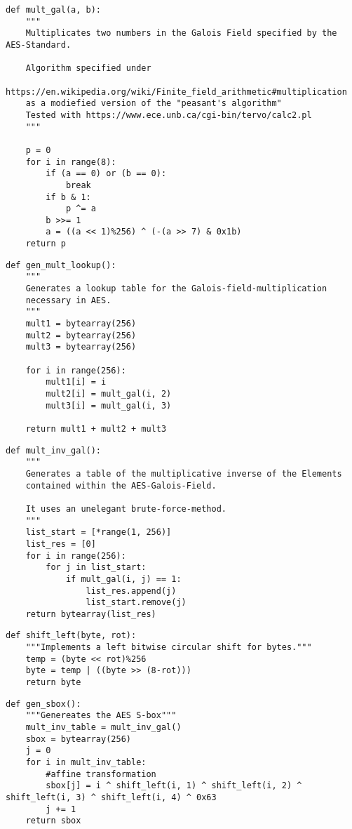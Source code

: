 \begin{lstlisting}
def mult_gal(a, b):
    """
    Multiplicates two numbers in the Galois Field specified by the AES-Standard.

    Algorithm specified under
    https://en.wikipedia.org/wiki/Finite_field_arithmetic#multiplication
    as a modiefied version of the "peasant's algorithm"
    Tested with https://www.ece.unb.ca/cgi-bin/tervo/calc2.pl
    """
    
    p = 0
    for i in range(8):
        if (a == 0) or (b == 0):
            break
        if b & 1:
            p ^= a
        b >>= 1
        a = ((a << 1)%256) ^ (-(a >> 7) & 0x1b)
    return p
\end{lstlisting}

\begin{lstlisting}
def gen_mult_lookup():
    """
    Generates a lookup table for the Galois-field-multiplication
    necessary in AES.
    """
    mult1 = bytearray(256)
    mult2 = bytearray(256)
    mult3 = bytearray(256)

    for i in range(256):
        mult1[i] = i
        mult2[i] = mult_gal(i, 2)
        mult3[i] = mult_gal(i, 3)

    return mult1 + mult2 + mult3
\end{lstlisting}
\begin{lstlisting}
def mult_inv_gal():
    """
    Generates a table of the multiplicative inverse of the Elements
    contained within the AES-Galois-Field.

    It uses an unelegant brute-force-method.
    """
    list_start = [*range(1, 256)]
    list_res = [0]
    for i in range(256):
        for j in list_start:
            if mult_gal(i, j) == 1:
                list_res.append(j)
                list_start.remove(j)
    return bytearray(list_res)
\end{lstlisting}
\begin{lstlisting}
def shift_left(byte, rot):
    """Implements a left bitwise circular shift for bytes."""
    temp = (byte << rot)%256
    byte = temp | ((byte >> (8-rot)))
    return byte
\end{lstlisting}
\begin{lstlisting}
def gen_sbox():
    """Genereates the AES S-box"""
    mult_inv_table = mult_inv_gal()
    sbox = bytearray(256)
    j = 0
    for i in mult_inv_table:
        #affine transformation
        sbox[j] = i ^ shift_left(i, 1) ^ shift_left(i, 2) ^ shift_left(i, 3) ^ shift_left(i, 4) ^ 0x63
        j += 1
    return sbox
\end{lstlisting}


